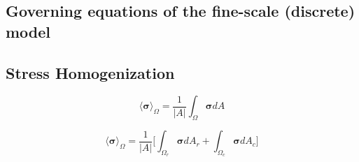 \subsection{Governing equations of the fine-scale (discrete) model}

\subsection{Stress Homogenization}

\begin{equation}
\label{eqn:stressav}
\langle \boldsymbol{\sigma} \rangle_\Omega = \frac{1}{\vert A \vert} \int_\Omega \boldsymbol{\sigma} { dA}
\end{equation}

\begin{equation}
\label{eqn:stresssplit}
\langle \boldsymbol{\sigma} \rangle_\Omega = \frac{1}{\vert A \vert} \bigg \lbrack {\int_{\Omega_{r}} \boldsymbol{\sigma} { dA_r} + \int_{\Omega_{c}} \boldsymbol{\sigma} { dA_c}} \bigg \rbrack
\end{equation}


